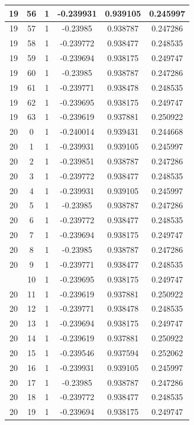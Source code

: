 \documentclass[12pt,a4paper]{article}
\numberwithin{equation}{section}
\numberwithin{figure}{section}
\numberwithin{table}{section}
\begin{document}
\begin{longtable}{|c|c|c|c|c|c|}
19 & 56 & 1 & -0.239931 & 0.939105 & 0.245997 \\ \hline
19 & 57 & 1 & -0.23985 & 0.938787 & 0.247286 \\ \hline
19 & 58 & 1 & -0.239772 & 0.938477 & 0.248535 \\ \hline
19 & 59 & 1 & -0.239694 & 0.938175 & 0.249747 \\ \hline
19 & 60 & 1 & -0.23985 & 0.938787 & 0.247286 \\ \hline
19 & 61 & 1 & -0.239771 & 0.938478 & 0.248535 \\ \hline
19 & 62 & 1 & -0.239695 & 0.938175 & 0.249747 \\ \hline
19 & 63 & 1 & -0.239619 & 0.937881 & 0.250922 \\ \hline
20 & 0 & 1 & -0.240014 & 0.939431 & 0.244668 \\ \hline
20 & 1 & 1 & -0.239931 & 0.939105 & 0.245997 \\ \hline
20 & 2 & 1 & -0.239851 & 0.938787 & 0.247286 \\ \hline
20 & 3 & 1 & -0.239772 & 0.938477 & 0.248535 \\ \hline
20 & 4 & 1 & -0.239931 & 0.939105 & 0.245997 \\ \hline
20 & 5 & 1 & -0.23985 & 0.938787 & 0.247286 \\ \hline
20 & 6 & 1 & -0.239772 & 0.938477 & 0.248535 \\ \hline
20 & 7 & 1 & -0.239694 & 0.938175 & 0.249747 \\ \hline
20 & 8 & 1 & -0.23985 & 0.938787 & 0.247286 \\ \hline
20 & 9 & 1 & -0.239771 & 0.938477 & 0.248535 \\ \hline
\pagebreak
20 & 10 & 1 & -0.239695 & 0.938175 & 0.249747 \\ \hline
20 & 11 & 1 & -0.239619 & 0.937881 & 0.250922 \\ \hline
20 & 12 & 1 & -0.239771 & 0.938478 & 0.248535 \\ \hline
20 & 13 & 1 & -0.239694 & 0.938175 & 0.249747 \\ \hline
20 & 14 & 1 & -0.239619 & 0.937881 & 0.250922 \\ \hline
20 & 15 & 1 & -0.239546 & 0.937594 & 0.252062 \\ \hline
20 & 16 & 1 & -0.239931 & 0.939105 & 0.245997 \\ \hline
20 & 17 & 1 & -0.23985 & 0.938787 & 0.247286 \\ \hline
20 & 18 & 1 & -0.239772 & 0.938477 & 0.248535 \\ \hline
20 & 19 & 1 & -0.239694 & 0.938175 & 0.249747 \\ \hline

\end{longtable}
\end{document}
